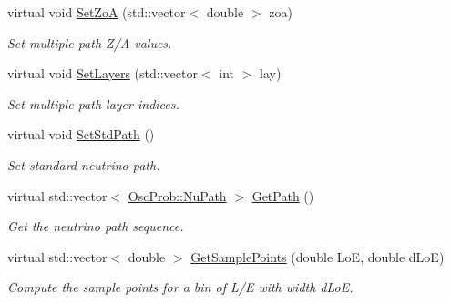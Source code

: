 \begin{DoxyCompactItemize}
virtual void \hyperlink{classOscProb_1_1PMNS__Base_a8495f8a320e1a21965e6a64aec92ad2a}{Set\+ZoA} (std\+::vector$<$ double $>$ zoa)
\begin{DoxyCompactList}\small\item\em Set multiple path Z/A values. \end{DoxyCompactList}\item 
virtual void \hyperlink{classOscProb_1_1PMNS__Base_a904e580edf89fb98bf9a6397739b4ebe}{Set\+Layers} (std\+::vector$<$ int $>$ lay)
\begin{DoxyCompactList}\small\item\em Set multiple path layer indices. \end{DoxyCompactList}\item 
virtual void \hyperlink{classOscProb_1_1PMNS__Base_add6533a9fc9acdfc7ae258b62570d78d}{Set\+Std\+Path} ()
\begin{DoxyCompactList}\small\item\em Set standard neutrino path. \end{DoxyCompactList}\item 
virtual std\+::vector$<$ \hyperlink{structOscProb_1_1NuPath}{Osc\+Prob\+::\+Nu\+Path} $>$ \hyperlink{classOscProb_1_1PMNS__Base_ac8e196f2e85a2b1caaf705073ee95a5c}{Get\+Path} ()
\begin{DoxyCompactList}\small\item\em Get the neutrino path sequence. \end{DoxyCompactList}\item 
virtual std\+::vector$<$ double $>$ \hyperlink{classOscProb_1_1PMNS__Base_a9eac8d768c1424755ee41f7e783af179}{Get\+Sample\+Points} (double LoE, double d\+LoE)
\begin{DoxyCompactList}\small\item\em Compute the sample points for a bin of L/E with width d\+LoE. \end{DoxyCompactList}\end{DoxyCompactItemize}
